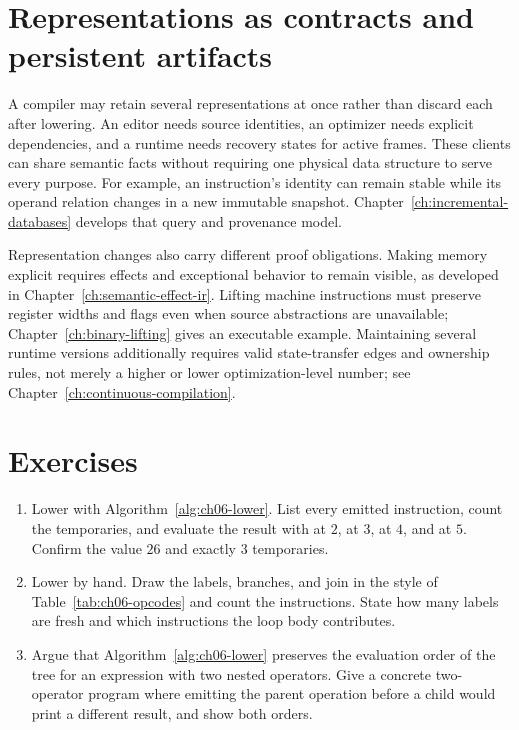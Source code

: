 \section{Representations as contracts and persistent artifacts}
\label{sec:ch06-architecture-links}

A compiler may retain several representations at once rather than discard each after lowering.
An editor needs source identities, an optimizer needs explicit dependencies, and a runtime needs recovery states for active frames.
These clients can share semantic facts without requiring one physical data structure to serve every purpose.
For example, an instruction's identity can remain stable while its operand relation changes in a new immutable snapshot.
Chapter~\ref{ch:incremental-databases} develops that query and provenance model.

Representation changes also carry different proof obligations.
Making memory explicit requires effects and exceptional behavior to remain visible, as developed in Chapter~\ref{ch:semantic-effect-ir}.
Lifting machine instructions must preserve register widths and flags even when source abstractions are unavailable; Chapter~\ref{ch:binary-lifting} gives an executable example.
Maintaining several runtime versions additionally requires valid state-transfer edges and ownership rules, not merely a higher or lower optimization-level number; see Chapter~\ref{ch:continuous-compilation}.

\section{Exercises}
\label{sec:ch06-exercises}

\begin{enumerate}
\item \label{ex:ch06-lower-count} Lower  with Algorithm~\ref{alg:ch06-lower}. List every emitted instruction, count the temporaries, and evaluate the result with  at $2$,  at $3$,  at $4$, and  at $5$. Confirm the value $26$ and exactly $3$ temporaries.
\item \label{ex:ch06-while-shape} Lower  by hand. Draw the labels, branches, and join in the style of Table~\ref{tab:ch06-opcodes} and count the instructions. State how many labels are fresh and which instructions the loop body contributes.
\item \label{ex:ch06-order-proof} Argue that Algorithm~\ref{alg:ch06-lower} preserves the evaluation order of the tree for an expression with two nested operators. Give a concrete two-operator program where emitting the parent operation before a child would print a different result, and show both orders.
\end{enumerate}


